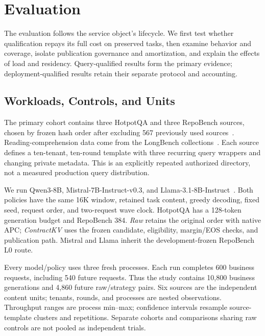 \section{Evaluation}
\label{sec:evaluation}

The evaluation follows the service object's lifecycle. We first test whether qualification repays its full cost on preserved tasks, then examine behavior and coverage, isolate publication governance and amortization, and explain the effects of load and residency. Query-qualified results form the primary evidence; deployment-qualified results retain their separate protocol and accounting.

\subsection{Workloads, Controls, and Units}
\label{sec:protocol}
The primary cohort contains three HotpotQA and three RepoBench sources, chosen by frozen hash order after excluding 567 previously used sources~\cite{hotpotqa2018,repobench2024}. Reading-comprehension data come from the LongBench collections~\cite{longbench2024}. Each source defines a ten-tenant, ten-round template with three recurring query wrappers and changing private metadata. This is an explicitly repeated authorized directory, not a measured production query distribution.

We run Qwen3-8B, Mistral-7B-Instruct-v0.3, and Llama-3.1-8B-Instruct~\cite{qwen32025,mistral2023,llama32024}. Both policies have the same 16K window, retained task content, greedy decoding, fixed seed, request order, and two-request wave clock. HotpotQA has a 128-token generation budget and RepoBench 384. \emph{Raw} retains the original order with native APC; \emph{ContractKV} uses the frozen candidate, eligibility, margin/EOS checks, and publication path. Mistral and Llama inherit the development-frozen RepoBench L0 route.

Every model/policy uses three fresh processes. Each run completes 600 business requests, including 540 future requests. Thus the study contains 10,800 business generations and 4,860 future raw/strategy pairs. Six sources are the independent content units; tenants, rounds, and processes are nested observations. Throughput ranges are process min--max; confidence intervals resample source-template clusters and repetitions. Separate cohorts and comparisons sharing raw controls are not pooled as independent trials.

